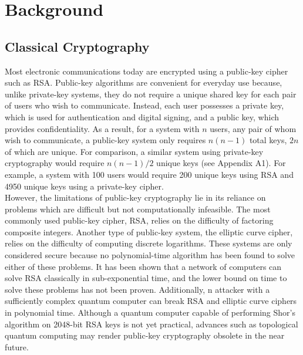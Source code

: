 \documentclass[conference]{IEEEtran}
\begin{document}
\section{Background}
\subsection{Classical Cryptography}
Most electronic communications today are encrypted using a public-key cipher such as RSA\cite{Rivest}. Public-key algorithms are convenient for everyday use because, unlike private-key systems, they do not require a unique shared key for each pair of users who wish to communicate. Instead, each user possesses a private key, which is used for authentication and digital signing, and a public key, which provides confidentiality. As a result, for a system with $n$ users, any pair of whom wish to communicate, a public-key system only requires $n(n-1)$ total keys, $2n$ of which are unique. For comparison, a similar system using private-key cryptography would require $n(n-1)/2$ unique keys (see Appendix A1). For example, a system with 100 users would require 200 unique keys using RSA and 4950 unique keys using a private-key cipher.\\

However, the limitations of public-key cryptography lie in its reliance on problems which are difficult but not computationally infeasible. The most commonly used public-key cipher, RSA, relies on the difficulty of factoring composite integers\cite{Rivest}. Another type of public-key system, the elliptic curve cipher, relies on the difficulty of computing discrete logarithms\cite{Rosing}. These systems are only considered secure because no polynomial-time algorithm has been found to solve either of these problems. It has been shown that a network of computers can solve RSA classically in sub-exponential time\cite{Weisstein}, and the lower bound on time to solve these problems has not been proven. Additionally, n attacker with a sufficiently complex quantum computer can break RSA and elliptic curve ciphers in polynomial time\cite{Shor}. Although a quantum computer capable of performing Shor's algorithm on 2048-bit RSA keys is not yet practical, advances such as topological quantum computing may render public-key cryptography obsolete in the near future.\\
\end{document}
